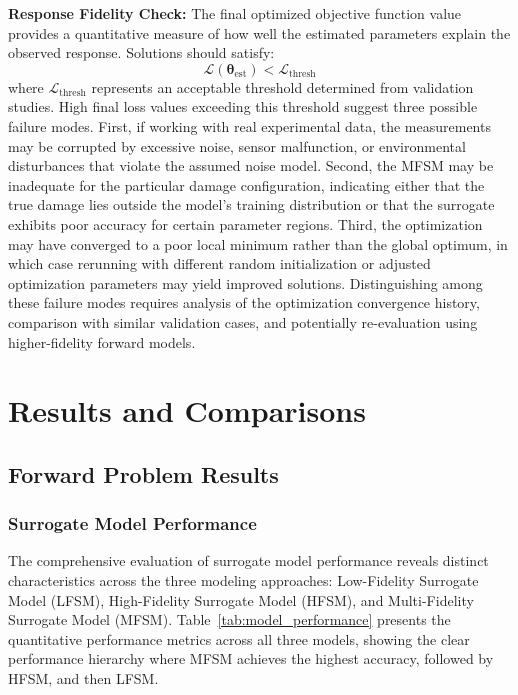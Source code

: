 \documentclass[12pt,a4paper]{report}
\begin{document}
\textbf{Response Fidelity Check:} The final optimized objective function value provides a quantitative measure of how well the estimated parameters explain the observed response. Solutions should satisfy:
\begin{equation}
\mathcal{L}(\boldsymbol{\theta}_{\text{est}}) < \mathcal{L}_{\text{thresh}}
\label{eq:loss_threshold}
\end{equation}
where $\mathcal{L}_{\text{thresh}}$ represents an acceptable threshold determined from validation studies. High final loss values exceeding this threshold suggest three possible failure modes. First, if working with real experimental data, the measurements may be corrupted by excessive noise, sensor malfunction, or environmental disturbances that violate the assumed noise model. Second, the MFSM may be inadequate for the particular damage configuration, indicating either that the true damage lies outside the model's training distribution or that the surrogate exhibits poor accuracy for certain parameter regions. Third, the optimization may have converged to a poor local minimum rather than the global optimum, in which case rerunning with different random initialization or adjusted optimization parameters may yield improved solutions. Distinguishing among these failure modes requires analysis of the optimization convergence history, comparison with similar validation cases, and potentially re-evaluation using higher-fidelity forward models.



\chapter{Results and Comparisons}
\label{chap:results}

\section{Forward Problem Results}

\subsection{Surrogate Model Performance}

The comprehensive evaluation of surrogate model performance reveals distinct characteristics across the three modeling approaches: Low-Fidelity Surrogate Model (LFSM), High-Fidelity Surrogate Model (HFSM), and Multi-Fidelity Surrogate Model (MFSM). Table~\ref{tab:model_performance} presents the quantitative performance metrics across all three models, showing the clear performance hierarchy where MFSM achieves the highest accuracy, followed by HFSM, and then LFSM.
\end{document}
